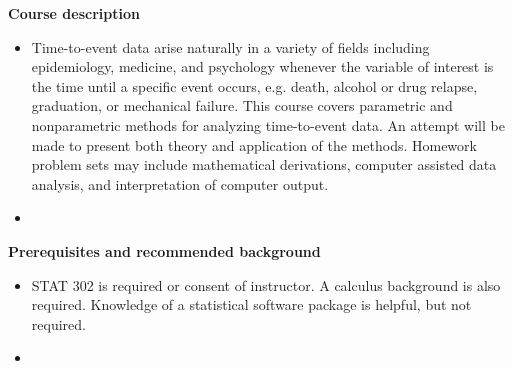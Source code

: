 \documentclass[letterpaper,12pt]{report}
\begin{document}
\textbf{Course description}
\begin{itemize}
\item[]
Time-to-event data arise naturally in a variety of fields including epidemiology, medicine, and psychology whenever the variable of interest is the time until a specific event occurs, e.g. death, alcohol or drug relapse, graduation, or mechanical failure. This course covers parametric and nonparametric methods for analyzing time-to-event data. An attempt will be made to present both theory and application of the methods. Homework problem sets may include mathematical derivations, computer assisted data analysis, and interpretation of computer output.
\item[]
\end{itemize}

\textbf{Prerequisites and recommended background}
\begin{itemize}
\item[]
STAT 302 is required or consent of instructor. A calculus background is also required. Knowledge of a statistical software package is helpful, but not required.
\item[]
\end{itemize}
\end{document}
